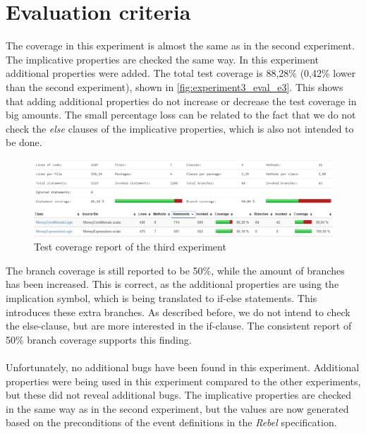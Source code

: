 \section{Evaluation criteria}
The coverage in this experiment is almost the same as in the second experiment. The implicative properties are checked the same way. In this experiment additional properties were added. The total test coverage is 88,28\% (0,42\% lower than the second experiment), shown in \autoref{fig:experiment3_eval_e3}. This shows that adding additional properties do not increase or decrease the test coverage in big amounts. The small percentage loss can be related to the fact that we do not check the \textit{else} clauses of the implicative properties, which is also not intended to be done.
\begin{figure}[!ht]
	\includegraphics[width=\linewidth]{figures/eval_e3}
\caption{Test coverage report of the third experiment}
\label{fig:experiment3_eval_e3}
\centering
\end{figure}
\FloatBarrier
The branch coverage is still reported to be 50\%, while the amount of branches has been increased. This is correct, as the additional properties are using the implication symbol, which is being translated to if-else statements. This introduces these extra branches. As described before, we do not intend to check the else-clause, but are more interested in the if-clause. The consistent report of 50\% branch coverage supports this finding.\\
\\
Unfortunately, no additional bugs have been found in this experiment. Additional properties were being used in this experiment compared to the other experiments, but these did not reveal additional bugs. The implicative properties are checked in the same way as in the second experiment, but the values are now generated based on the preconditions of the event definitions in the \textit{Rebel} specification.\\
\\
